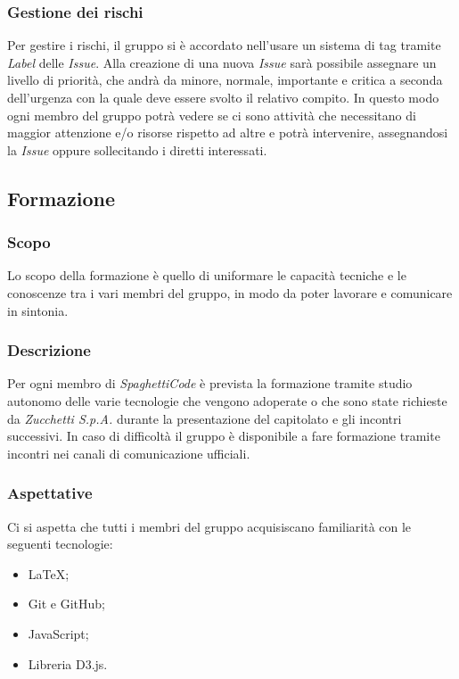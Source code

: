 \subsubsection{Gestione dei rischi}

Per gestire i rischi, il gruppo si è accordato nell'usare un sistema di tag tramite \emph{Label} delle \emph{Issue}. 
Alla creazione di una nuova \emph{Issue} sarà possibile assegnare un livello di priorità, che andrà da minore, normale, 
importante e critica a seconda dell'urgenza con la quale deve essere svolto il relativo compito. In questo modo ogni 
membro del gruppo potrà vedere se ci sono attività che necessitano di maggior attenzione e/o risorse rispetto ad altre 
e potrà intervenire, assegnandosi la \emph{Issue} oppure sollecitando i diretti interessati.

\subsection{Formazione}

\subsubsection{Scopo}

Lo scopo della formazione è quello di uniformare le capacità tecniche e le conoscenze tra i vari membri del gruppo, in 
modo da poter lavorare e comunicare in sintonia.

\subsubsection{Descrizione}

Per ogni membro di \emph{SpaghettiCode} è prevista la formazione tramite studio autonomo delle varie tecnologie che 
vengono adoperate o che sono state richieste da \emph{Zucchetti S.p.A.} durante la presentazione del capitolato e 
gli incontri successivi. In caso di difficoltà il gruppo è disponibile a fare formazione tramite incontri nei 
canali di comunicazione ufficiali.

\subsubsection{Aspettative}

Ci si aspetta che tutti i membri del gruppo acquisiscano familiarità con le seguenti tecnologie:
\begin{itemize}
    \item \LaTeX;
    \item Git e GitHub;
    \item JavaScript;
    \item Libreria D3.js.
\end{itemize}
